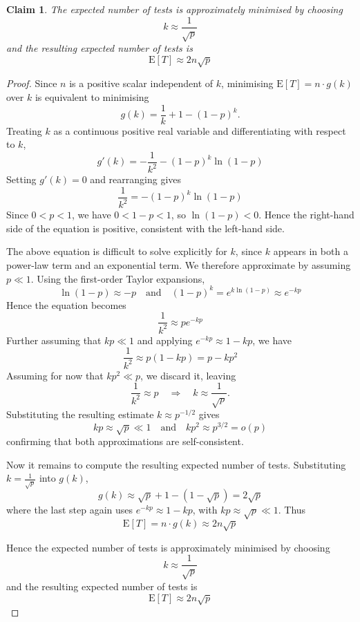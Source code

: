\documentclass{article}
\newtheorem{claim}{Claim}
\begin{document}
\begin{claim}
    The expected number of tests is approximately minimised by choosing 
    \[
    k \approx \frac{1}{\sqrt{p}}
    \]
    and the resulting expected number of tests is 
    \[
    \mathrm{E}[T] \approx 2n\sqrt{p}
    \]
\end{claim}

\begin{proof}
    Since $n$ is a positive scalar independent of $k$, minimising $\mathrm{E}[T] = n \cdot g(k)$ over $k$ is 
    equivalent to minimising
    \[
    g(k) = \frac{1}{k} + 1 - (1-p)^k.
    \]
    Treating $k$ as a continuous positive real variable and differentiating with respect to $k$,
    \[
    g'(k) = -\frac{1}{k^2} - (1-p)^k \ln(1-p)
    \]
    Setting $g'(k) = 0$ and rearranging gives
    \[
    \frac{1}{k^2} = -(1-p)^k \ln(1-p)
    \]
    Since $0 < p < 1$, we have $0 < 1-p < 1$, so $\ln(1-p) < 0$. Hence the right-hand side of the equation is
    positive, consistent with the left-hand side.

    \medskip

    The above equation is difficult to solve explicitly for $k$, since $k$ appears in both a power-law term 
    and an exponential term. We therefore approximate by assuming $p \ll 1$. Using the first-order Taylor 
    expansions,
    \[
    \ln(1-p) \approx -p \quad \text{and} \quad (1-p)^k = e^{k\ln(1-p)} \approx e^{-kp}
    \]
    Hence the equation becomes 
    \[
    \frac{1}{k^2} \approx pe^{-kp}
    \]
    Further assuming that $kp \ll 1$ and applying $e^{-kp} \approx 1 - kp$, we have 
    \[
    \frac{1}{k^2} \approx p(1 - kp) = p - kp^2
    \]
    Assuming for now that $kp^2 \ll p$, we discard it, leaving 
    \[
    \frac{1}{k^2} \approx p \quad \Longrightarrow \quad k \approx \frac{1}{\sqrt{p}}.
    \]
    Substituting the resulting estimate $k \approx p^{-1/2}$ gives
    \[
    kp \approx \sqrt{p} \ll 1 \quad \text{and} \quad kp^2 \approx p^{3/2} = o(p)
    \]
    confirming that both approximations are self-consistent.

    \medskip

    Now it remains to compute the resulting expected number of tests. Substituting $k = \frac{1}{\sqrt{p}}$ 
    into $g(k)$, 
    \[
    g(k) \approx \sqrt{p} + 1 - (1 - \sqrt{p}) = 2\sqrt{p}
    \]
    where the last step again uses $e^{-kp} \approx 1 - kp$, with $kp \approx \sqrt{p} \ll 1$. Thus
    \[
    \mathrm{E}[T] = n \cdot g(k) \approx 2n\sqrt{p}
    \]

    \medskip

    Hence the expected number of tests is approximately minimised by choosing 
    \[
    k \approx \frac{1}{\sqrt{p}}
    \]
    and the resulting expected number of tests is 
    \[
    \mathrm{E}[T] \approx 2n\sqrt{p}
    \]
\end{proof}
\end{document}
